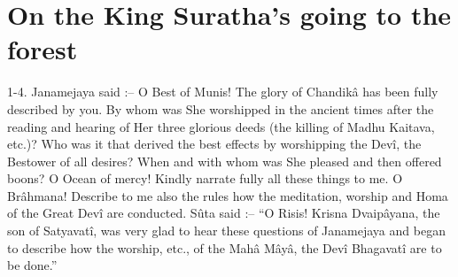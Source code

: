 ﻿\chapter{On the King Suratha's going to the forest}

1-4. Janamejaya said :-- O Best of Munis! The glory of Chandik\^a has been fully described by you. By whom was She worshipped in the ancient times after the reading and hearing of Her three glorious deeds (the killing of Madhu Kaitava, etc.)? Who was it that derived the best effects by worshipping the Dev\^i, the Bestower of all desires? When and with whom was She pleased and then offered boons? O Ocean of mercy! Kindly narrate fully all these things to me. O Br\^ahmana! Describe to me also the rules how the meditation, worship and Homa of the Great Dev\^i are conducted. S\^uta said :-- ``O Risis! Krisna Dvaip\^ayana, the son of Satyavat\^i, was very glad to hear these questions of Janamejaya and began to describe how the worship, etc., of the Mah\^a M\^ay\^a, the Dev\^i Bhagavat\^i are to be done.''

